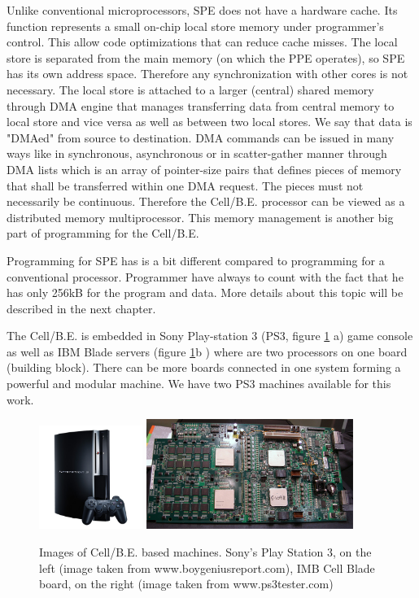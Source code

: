 \par
Unlike conventional microprocessors, SPE does not have a hardware cache.
Its function represents a small on-chip local store memory under programmer's control.
This allow code optimizations that can reduce cache misses.
The local store is separated from the main memory (on which the PPE operates), so SPE has its own address space.
Therefore any synchronization with other cores is not necessary.
The local store is attached to a larger (central) shared memory through DMA engine that manages transferring data from central memory to local store and vice versa as well as between two local stores.
We say that data is "DMAed" from source to destination.
DMA commands can be issued in many ways like in synchronous, asynchronous or in scatter-gather manner through DMA lists which is an array of pointer-size pairs that defines pieces of memory that shall be transferred within one DMA request.
The pieces must not necessarily be continuous.
Therefore the Cell/B.E. processor can be viewed as a distributed memory multiprocessor.
This memory management is another big part of programming for the Cell/B.E.

\par
Programming for SPE has is a bit different compared to programming for a conventional processor.
Programmer have always to count with the fact that he has only 256kB for the program and data.
More details about this topic will be described in the next chapter.

\par
The Cell/B.E. is embedded in Sony Play-station 3 (PS3, figure \ref{fg:cellmachines} a) game console as well as IBM Blade servers (figure \ref{fg:cellmachines}b ) where are two processors on one board (building block).
There can be more boards connected in one system forming a powerful and modular machine.
We have two PS3 machines available for this work.

\begin{figure}
    \centering
    \includegraphics[width=0.3\textwidth]{data/png/PS3}
    \includegraphics[width=0.6\textwidth]{data/png/ibm-cell-board}
    \caption[Cell/B.E. based machines]{Images of Cell/B.E. based machines.
Sony's Play Station 3, on the left (image taken from www.boygeniusreport.com), IMB Cell Blade board, on the right (image taken from www.ps3tester.com)
}
    \label{fg:cellmachines}
\end{figure}

